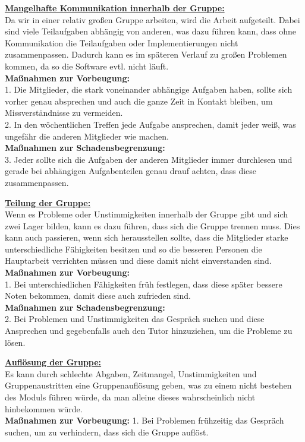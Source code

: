 \documentclass[fontsize=12pt,paper=a4,twoside]{scrartcl}
\begin{document}
\textbf{\underline{Mangelhafte Kommunikation innerhalb der Gruppe:}}\\
Da wir in einer relativ großen Gruppe arbeiten, wird die Arbeit aufgeteilt. Dabei sind viele Teilaufgaben abhängig von anderen, was dazu führen kann, dass ohne Kommunikation die Teilaufgaben oder Implementierungen nicht zusammenpassen. Dadurch kann es im späteren Verlauf zu großen Problemen kommen, da so die Software evtl. nicht läuft.\\
\textbf{Maßnahmen zur Vorbeugung:}\\
1. Die Mitglieder, die stark voneinander abhängige Aufgaben haben, sollte sich vorher genau absprechen und auch die ganze Zeit in Kontakt bleiben, um Missverständnisse zu vermeiden.\\
2. In den wöchentlichen Treffen jede Aufgabe ansprechen, damit jeder weiß, was ungefähr die anderen Mitglieder wie machen.\\
\textbf{Maßnahmen zur Schadensbegrenzung:}\\
3. Jeder sollte sich die Aufgaben der anderen Mitglieder immer durchlesen und gerade bei abhängigen Aufgabenteilen genau drauf achten, dass diese zusammenpassen.\\

\bigskip

\textbf{\underline{Teilung der Gruppe:}}\\
Wenn es Probleme oder Unstimmigkeiten innerhalb der Gruppe gibt und sich zwei Lager bilden, kann es dazu führen, dass sich die Gruppe trennen muss. Dies kann auch passieren, wenn sich herausstellen sollte, dass die Mitglieder starke unterschiedliche Fähigkeiten besitzen und so die besseren Personen die Hauptarbeit verrichten müssen und diese damit nicht einverstanden sind.\\
\textbf{Maßnahmen zur Vorbeugung:}\\
1. Bei unterschiedlichen Fähigkeiten früh festlegen, dass diese später bessere Noten bekommen, damit diese auch zufrieden sind.\\
\textbf{Maßnahmen zur Schadensbegrenzung:}\\
2. Bei Problemen und Unstimmigkeiten das Gespräch suchen und diese Ansprechen und gegebenfalls auch den Tutor hinzuziehen, um die Probleme zu lösen.\\

\bigskip

\textbf{\underline{Auflösung der Gruppe:}}\\
Es kann durch schlechte Abgaben, Zeitmangel, Unstimmigkeiten und Gruppenaustritten eine Gruppenauflösung geben, was zu einem nicht bestehen des Moduls führen würde, da man alleine dieses wahrscheinlich nicht hinbekommen würde. \\
\textbf{Maßnahmen zur Vorbeugung:}
1. Bei Problemen frühzeitig das Gespräch suchen, um zu verhindern, dass sich die Gruppe auflöst.\\
\end{document}
